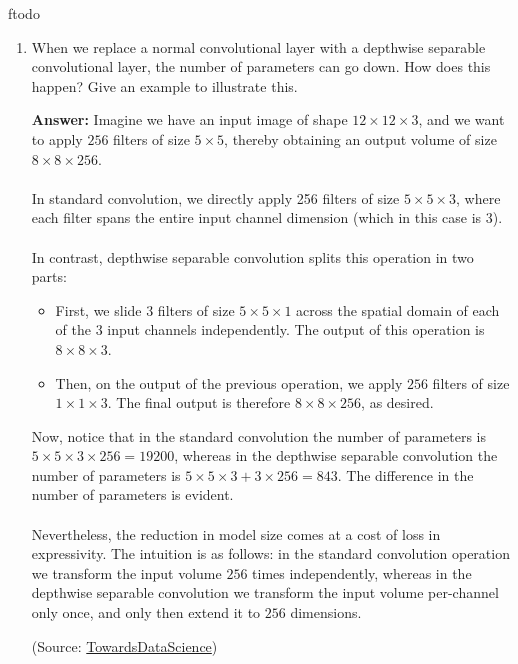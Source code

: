 ƒtodo\documentclass{article}
\newenvironment{QandA}{\begin{enumerate}[label=\arabic*.]}{\end{enumerate}}
\newenvironment{answer}{\par\normalfont \textbf{Answer:}}{}
\begin{document}
\begin{QandA}
    \item When we replace a normal convolutional layer with a depthwise separable convolutional layer, the number of parameters can go down. How does this happen? Give an example to illustrate this.
    \begin{answer}
        Imagine we have an input image of shape $12 \times 12 \times 3$, and we want to apply $256$ filters of size $5 \times 5$, thereby obtaining an output volume of size $8 \times 8 \times 256$. \\\\
        In standard convolution, we  directly apply 256 filters of size $5 \times 5 \times 3$, where each filter spans the entire input channel dimension (which in this case is 3). \\\\
        In contrast, depthwise separable convolution splits this operation in two parts:
        \begin{itemize}
            \item First, we slide $3$ filters of size $5 \times 5 \times 1$ across the spatial domain of each of the $3$ input channels independently. The output of this operation is $8 \times 8 \times 3$. 
            \item Then, on the output of the previous operation, we apply $256$ filters of size $1 \times 1 \times 3$. The final output is therefore $8 \times 8 \times 256$, as desired.
        \end{itemize}
        Now, notice that in the standard convolution the number of parameters is $5 \times 5 \times 3 \times 256 = 19200$, whereas in the depthwise separable convolution the number of parameters is $5 \times 5 \times 3 + 3 \times 256 = 843$. The difference in the number of parameters is evident. \\\\
        Nevertheless, the reduction in model size comes at a cost of loss in expressivity. The intuition is as follows: in the standard convolution operation we transform the input volume $256$ times independently, whereas in the depthwise separable convolution we transform the input volume per-channel only once, and only then extend it to $256$ dimensions.

        (Source: \href{https://towardsdatascience.com/a-basic-introduction-to-separable-convolutions-b99ec3102728#:~:text=The%20depthwise%20separable%20convolution%20is,image%20may%20have%20multiple%20channels.}{TowardsDataScience})
    \end{answer}


\end{QandA}
\end{document}

